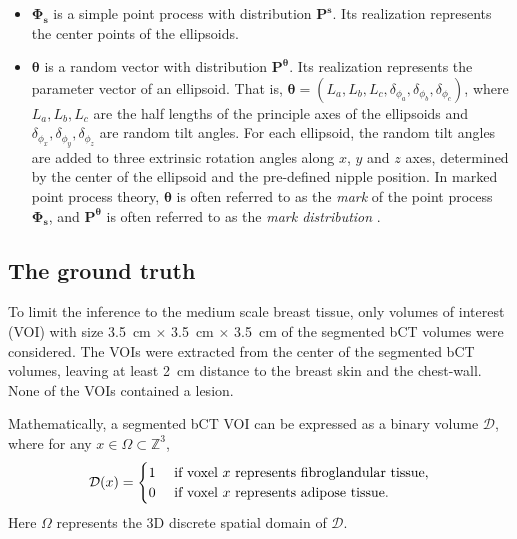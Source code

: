 \documentclass[journal]{IEEEtran}
\begin{document}
\begin{itemize}

\item $\mathbf{\Phi_s}$ is a simple point process with distribution
  $\mathbf{P}^{\mathbf{s}}$. Its realization represents the center
  points of the ellipsoids.

\item $\boldsymbol{\theta}$ is a random vector with distribution
  $\mathbf{P}^{\boldsymbol{\theta}}$. Its realization represents the
  parameter vector of an ellipsoid. That is,
  $\boldsymbol{\theta} = \left( L_a, L_b, L_c, \delta_{\phi_a},
    \delta_{\phi_b}, \delta_{\phi_c} \right)$, where $L_a, L_b, L_c$
  are the half lengths of the principle axes of the ellipsoids and
  $\delta_{\phi_{x}},\delta_{\phi_{y}},\delta_{\phi_{z}}$ are random
  tilt angles. For each ellipsoid, the random tilt angles are added to
  three extrinsic rotation angles along $x$, $y$ and $z$ axes,
  determined by the center of the ellipsoid and the pre-defined nipple
  position. In marked point process theory, $\boldsymbol{\theta}$ is
  often referred to as the \textit{mark} of the point process
  $\mathbf{\Phi_s}$, and $\mathbf{P}^{\boldsymbol{\theta}}$ is often
  referred to as the \textit{mark distribution}
  \cite{chiu2013stochastic}.
\end{itemize}

\subsection{The ground truth}
\label{sec:ground-truth}

To limit the inference to the medium scale breast tissue, only volumes
of interest (VOI) with size \SI{3.5}{\cm} $\times$ \SI{3.5}{\cm}
$\times$ \SI{3.5}{\cm} of the segmented bCT volumes were
considered. The VOIs were extracted from the center of the segmented
bCT volumes, leaving at least \SI{2}{\cm} distance to the breast skin
and the chest-wall. None of the VOIs contained a lesion.

Mathematically, a segmented bCT VOI can be expressed as a binary
volume $\mathcal{D}$, where for any
$x \in \Omega \subset \mathbb{Z}^3$,
\begin{equation}
  \label{eq:bct-discrete-form}
  \mathcal{D}(x) =
  \begin{cases}
    1 & \textnormal{ if voxel } x \textnormal{ represents
      fibroglandular tissue}, \\
    0 & \textnormal{ if voxel } x \textnormal{ represents
      adipose tissue}. \\
  \end{cases}
\end{equation}
Here $\Omega$ represents the 3D discrete spatial domain of
$\mathcal{D}$.
\end{document}
